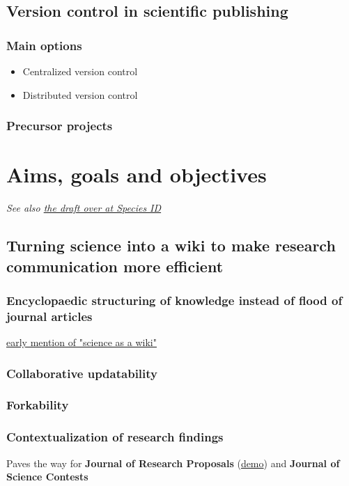\documentclass[final,authoryear,3p]{elsarticle-open-drafting}
\begin{document}
\subsection{Version control in scientific publishing}
\subsubsection{Main options}
\begin{itemize}
	\item Centralized version control
	\item Distributed version control
\end{itemize}
	
\subsubsection{Precursor projects}

\section{Aims, goals and objectives}
{\it See also \href{http://species-id.net/wiki/Draft:Encyclopaedia_of_original_research#Aims,_Goals_and_Objectives}{the draft over at Species ID}}

\subsection{Turning science into a wiki to make research communication more efficient}
\subsubsection{Encyclopaedic structuring of knowledge instead of flood of journal articles}

\href{http://opencontract.org/}{early mention of "science as a wiki"}

\subsubsection{Collaborative updatability}
\subsubsection{Forkability}
\subsubsection{Contextualization of research findings}
Paves the way for {\bf Journal of Research Proposals} (\href{http://iphylo.blogspot.com/2011/06/would-you-give-me-grant-experiment-in.html}{demo}) and {\bf Journal of Science Contests}
\end{document}
